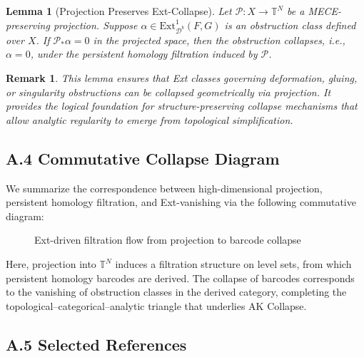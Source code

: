 \documentclass[11pt]{article}
\newtheorem{remark}[theorem]{Remark}
\newtheorem{lemma}[theorem]{Lemma}
\begin{document}
\begin{lemma}[Projection Preserves Ext-Collapse]
Let $\mathcal{P} : X \to \mathbb{T}^N$ be a MECE-preserving projection.  
Suppose $\alpha \in \mathrm{Ext}^1_{\mathcal{D}^b}(F, G)$ is an obstruction class defined over $X$.  
If $\mathcal{P}_\ast \alpha = 0$ in the projected space, then the obstruction collapses, i.e., $\alpha = 0$, under the persistent homology filtration induced by $\mathcal{P}$.
\end{lemma}

\begin{remark}
This lemma ensures that Ext classes governing deformation, gluing, or singularity obstructions can be collapsed geometrically via projection.  
It provides the logical foundation for structure-preserving collapse mechanisms that allow analytic regularity to emerge from topological simplification.
\end{remark}

\subsection*{A.4 Commutative Collapse Diagram}

We summarize the correspondence between high-dimensional projection, persistent homology filtration, and Ext-vanishing via the following commutative diagram:

\begin{figure}[htbp]
\centering
{}
\caption{Ext-driven filtration flow from projection to barcode collapse}
\end{figure}


Here, projection into $\mathbb{T}^N$ induces a filtration structure on level sets, from which persistent homology barcodes are derived.  
The collapse of barcodes corresponds to the vanishing of obstruction classes in the derived category, completing the topological–categorical–analytic triangle that underlies AK Collapse.

\subsection*{A.5 Selected References}
\end{document}
